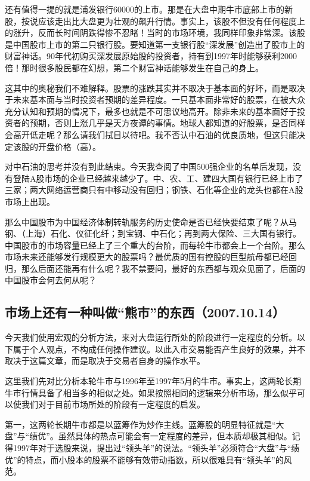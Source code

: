 还有值得一提的就是浦发银行60000的上市。那是在大盘中期牛市底部上市的新股，按说应该走出比大盘更为壮观的飙升行情。事实上，该股不但没有任何程度上的涨升，反而长时间阴跌得惨不忍睹！当时的市场环境，我同样印象非常深。该股是中国股市上市的第二只银行股。要知道第一支银行股“深发展”创造出了股市上的财富神话。90年代初购买深发展原始股的投资者，持有到1997年时能够获利2000倍！那时很多股民都在幻想，第二个财富神话能够发生在自己的身上。

这其中的奥秘我们不难解释。股票的涨跌其实并不取决于基本面的好坏，而是取决于未来基本面与当时投资者预期的差异程度。一只基本面非常好的股票，在被大众充分认知和预期的情况下，最多也就是不可思议地高开。除非未来的基本面好于投资者的预期，否则上涨几乎是天方夜谭的事情。地球人都知道的好股票，是否同样会高开低走呢？那么请我们拭目以待吧。我不否认中石油的优良质地，但这只能决定该股的开盘价格（高）。

对中石油的思考并没有到此结束。今天我查阅了中国500强企业的名单后发现，没有登陆A股市场的企业已经越来越少了。中、农、工、建四大国有银行已经上市了三家；两大网络运营商只有中移动没有回归；钢铁、石化等企业的龙头也都在A股市场上出现。

那么中国股市为中国经济体制转轨服务的历史使命是否已经快要结束了呢？从马钢、（上海）石化、仪征化纤；到宝钢、中石化；再到两大保险、三大国有银行。中国股市的市场容量已经上了三个重大的台阶，而每轮牛市都会上一个台阶。那么市场未来还能够发行规模更大的股票吗？最优质的国有控股的巨型航母都已经回归，那么后面还能再有什么呢？我不禁要问，最好的东西都与观众见面了，后面的中国股市会何去何从呢？

\subsection{市场上还有一种叫做“熊市”的东西（2007.10.14）}

今天我们使用宏观的分析方法，来对大盘运行所处的阶段进行一定程度的分析。以下属于个人观点，不构成任何操作建议。以此入市交易能否产生良好的效果，并不取决于这篇文章，而是取决于交易者自身的操作水平。

这里我们先对比分析本轮牛市与1996年至1997年5月的牛市。事实上，这两轮长期牛市行情具备了相当多的相似之处。如果按照相同的逻辑来分析市场，那么似乎可以使我们对于目前市场所处的阶段有一定程度的启发。

第一，这两轮长期牛市都是以蓝筹作为炒作主线。蓝筹股的明显特征就是“大盘”与“绩优”。虽然具体的热点可能会有一定程度的差异，但本质却极其相似。记得1997年对于选股来说，提出过“领头羊”的说法。“领头羊”必须符合“大盘”与“绩优”的特点，而小股本的股票不能够有效带动指数，所以很难具有“领头羊”的风范。

